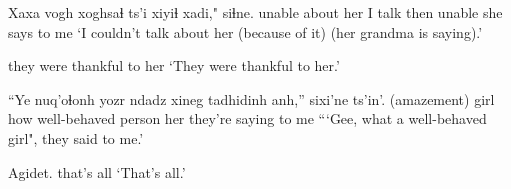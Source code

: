 \documentclass[12pt]{article}
\begin{document}
\gll Xaxa     vogh    xoghsaɬ ts'i xiyiɬ xadi," siɬne.
unable   {about her} {I talk} {} then unable      {she says to me}
\glt `I couldn't talk about her (because of it) (her grandma is saying).' 
\glend

{{they were thankful to her}}
\glt `They were thankful to her.'
\glend

\gll ``Ye  {nuq'oɬonh yozr} ndadz {xineg tadhidinh} anh,''       sixi'ne              ts'in'.
{(amazement)} girl      how   {well-behaved person} her {they're saying to me}
\glt ```Gee, what a well-behaved girl", they said to me.'
\glend

\gll Agidet.
{{that's all}}
\glt `That's all.'
\glend
\end{document}
